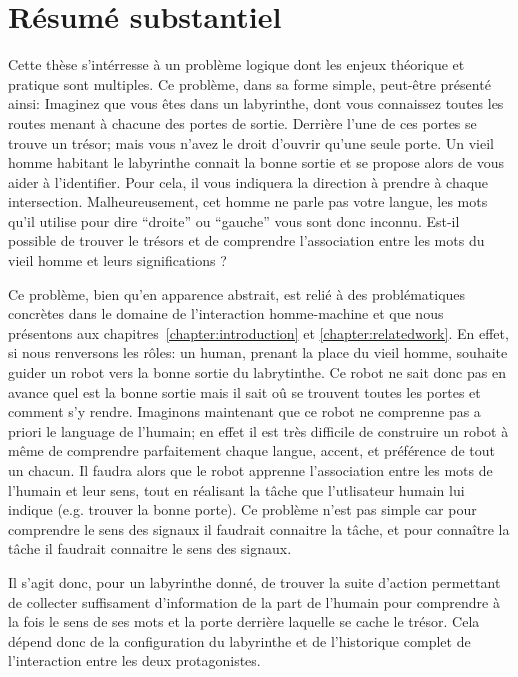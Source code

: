 
\chapter*{Résumé substantiel}
\label{chapter:frecnhresume}
\minitoc

Cette thèse s'intérresse à un problème logique dont les enjeux théorique et pratique sont multiples. Ce problème, dans sa forme simple, peut-être présenté ainsi: Imaginez que vous êtes dans un labyrinthe, dont vous connaissez toutes les routes menant à chacune des portes de sortie. Derrière l'une de ces portes se trouve un trésor; mais vous n'avez le droit d'ouvrir qu'une seule porte. Un vieil homme habitant le labyrinthe connait la bonne sortie et se propose alors de vous aider à l'identifier. Pour cela, il vous indiquera la direction à prendre à chaque intersection. Malheureusement, cet homme ne parle pas votre langue, les mots qu'il utilise pour dire ``droite'' ou ``gauche'' vous sont donc inconnu. Est-il possible de trouver le trésors et de comprendre l'association entre les mots du vieil homme et leurs significations ?

Ce problème, bien qu'en apparence abstrait, est relié à des problématiques concrètes dans le domaine de l'interaction homme-machine et que nous présentons aux chapitres~\ref{chapter:introduction} et \ref{chapter:relatedwork}. En effet, si nous renversons les rôles: un human, prenant la place du vieil homme, souhaite guider un robot vers la bonne sortie du labrytinthe. Ce robot ne sait donc pas en avance quel est la bonne sortie mais il sait oû se trouvent toutes les portes et comment s'y rendre. Imaginons maintenant que ce robot ne comprenne pas a priori le language de l'humain; en effet il est très difficile de construire un robot à même de comprendre parfaitement chaque langue, accent, et préférence de tout un chacun. Il faudra alors que le robot apprenne l'association entre les mots de l'humain et leur sens, tout en réalisant la tâche que l'utlisateur humain lui indique (e.g. trouver la bonne porte). Ce problème n'est pas simple car pour comprendre le sens des signaux il faudrait connaitre la tâche, et pour connaître la tâche il faudrait connaitre le sens des signaux.

Il s'agit donc, pour un labyrinthe donné, de trouver la suite d'action permettant de collecter suffisament d'information de la part de l'humain pour comprendre à la fois le sens de ses mots et la porte derrière laquelle se cache le trésor. Cela dépend donc de la configuration du labyrinthe et de l'historique complet de l'interaction entre les deux protagonistes.

